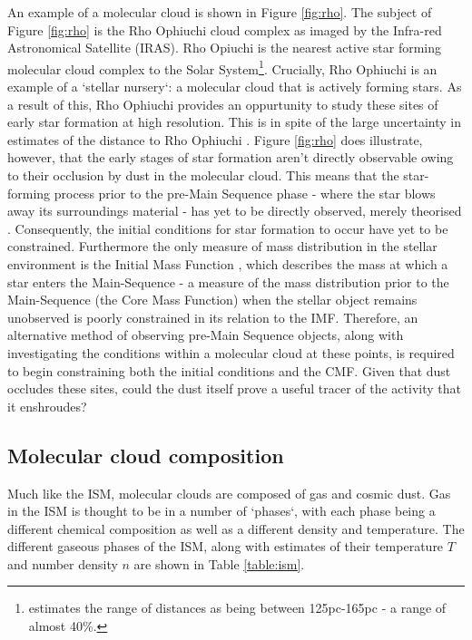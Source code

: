 \documentclass{report}
\begin{document}
An example of a molecular cloud is shown in Figure \ref{fig:rho}. The subject of Figure \ref{fig:rho} is the Rho Ophiuchi cloud complex as imaged by the Infra-red Astronomical Satellite (IRAS). Rho Opiuchi is the nearest active star forming molecular cloud complex to the Solar System\footnote{\textcite{rho-dist} estimates the range of distances as being between 125pc-165pc - a range of almost 40\%.}. Crucially, Rho Ophiuchi is an example of a `stellar nursery`: a molecular cloud that is actively forming stars. As a result of this, Rho Ophiuchi provides an  oppurtunity to study these sites of early star formation at high resolution. This is in spite of the large uncertainty in estimates of the distance to Rho Ophiuchi \parencite{rho-dist}. Figure \ref{fig:rho} does illustrate, however, that the early stages of star formation aren't directly observable owing to their occlusion by dust in the molecular cloud. This means that the star-forming process prior to the pre-Main Sequence phase - where the star blows away its surroundings material - has yet to be directly observed, merely theorised \parencite{hayashi}. Consequently, the initial conditions for star formation to occur have yet to be constrained. Furthermore the only measure of mass distribution in the stellar environment is the Initial Mass Function \parencite{imf}, which describes the mass at which a star enters the Main-Sequence - a measure of the mass distribution prior to the Main-Sequence (the Core Mass Function) when the stellar object remains unobserved is poorly constrained in its relation to the IMF. Therefore, an alternative method of observing pre-Main Sequence objects, along with investigating the conditions within a molecular cloud at these points, is required to begin constraining both the initial conditions and the CMF. Given that dust occludes these sites, could the dust itself prove a useful tracer of the activity that it enshroudes?

\subsection{Molecular cloud composition}
Much like the ISM, molecular clouds are composed of gas and cosmic dust. Gas in the ISM is thought to be in a number of `phases`, with each phase being a different chemical composition as well as a different density and temperature. The different gaseous phases of the ISM, along with estimates of their temperature $T$ and number density $n$ are shown in Table \ref{table:ism}.
\end{document}
